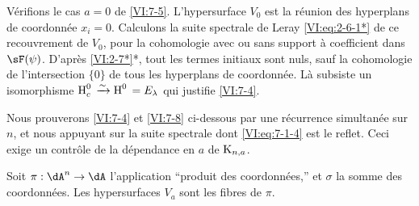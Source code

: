 V\'erifions le cas $a=0$ de \ref{VI:7-5}. L'hypersurface $V_0$ est la r\'eunion 
des hyperplans de coordonn\'ee $x_i=0$. Calculons la suite spectrale de Leray 
\eqref{VI:eq:2-6-1*} de ce recouvrement de $V_0$, pour la cohomologie avec ou 
sans support \`a coefficient dans $\sF(\psi)$. D'apr\`es \ref{VI:2-7*}*, tout 
les termes initiaux sont nuls, sauf la cohomologie de l'intersection $\{0\}$ de 
tous les hyperplans de coordonn\'ee. L\`a subsiste un isomorphisme 
$\operatorname{H}_c^0{}\xrightarrow\sim \operatorname{H}^0{}=E_\lambda$ qui justifie \ref{VI:7-4}. 

Nous prouverons \ref{VI:7-4} et \ref{VI:7-8} ci-dessous par une r\'ecurrence 
simultan\'ee sur $n$, et nous appuyant sur la suite spectrale dont 
\eqref{VI:eq:7-1-4} est le reflet. Ceci exige un contr\^ole de la d\'ependance 
en $a$ de $\textnormal{K}_{n,a}$. 

Soit $\pi:\dA^n \to \dA$ l'application ``produit des coordonn\'ees,'' et 
$\sigma$ la somme des coordonn\'ees. Les hypersurfaces $V_a$ sont les fibres de 
$\pi$. 





